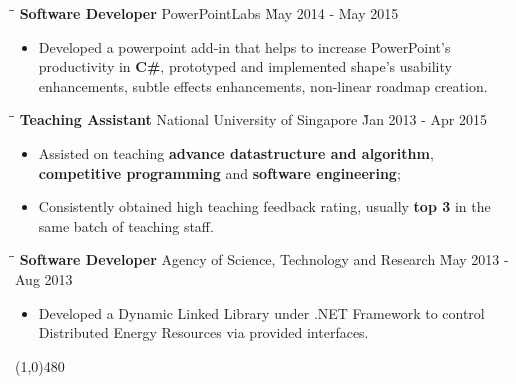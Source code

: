 \documentclass{article}
\begin{document}

\begin{tabbing}
\hspace{2.6in}\= \hspace{2.6in}\= \kill
{\bf Software Developer} \> PowerPointLabs \`May 2014 - May 2015\
\end{tabbing}

\begin{itemize}
    \item Developed a powerpoint add-in that helps to increase PowerPoint's productivity in {\bf C\#}, prototyped and implemented shape's usability enhancements, subtle effects enhancements, non-linear roadmap creation. \vspace{-6pt}
\end{itemize}

\begin{tabbing}
\hspace{2.2in}\= \hspace{2.6in}\= \kill
{\bf Teaching Assistant} \> National University of Singapore \`Jan 2013 - Apr 2015\
\end{tabbing}

\begin{itemize}
    \item Assisted on teaching {\bf advance datastructure and algorithm}, {\bf competitive programming} and {\bf software engineering}; \vspace{-6pt}
    \item Consistently obtained high teaching feedback rating, usually {\bf top 3} in the same batch of teaching staff.
\end{itemize}

\begin{tabbing}
\hspace{1.8in} \= \hspace{2.6in}\= \kill
{\bf Software Developer} \> Agency of Science, Technology and Research \`May 2013 - Aug 2013\
\end{tabbing}

\begin{itemize}
  \item Developed a Dynamic Linked Library under .NET Framework to control Distributed Energy Resources via provided interfaces.
\end{itemize}

\centerline{\line(1,0){480}}

\medskip
\end{document}
